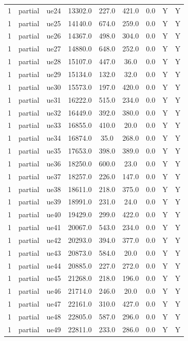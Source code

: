 \begin{table}[ht]
\begin{tabular}{|c|c|c|c|c|c|c|c|c|}
1 & partial & ue24 & 13302.0 & 227.0 & 421.0 & 0.0 & Y & Y \\
1 & partial & ue25 & 14140.0 & 674.0 & 259.0 & 0.0 & Y & Y \\
1 & partial & ue26 & 14367.0 & 498.0 & 304.0 & 0.0 & Y & Y \\
1 & partial & ue27 & 14880.0 & 648.0 & 252.0 & 0.0 & Y & Y \\
1 & partial & ue28 & 15107.0 & 447.0 & 36.0 & 0.0 & Y & Y \\
1 & partial & ue29 & 15134.0 & 132.0 & 32.0 & 0.0 & Y & Y \\
1 & partial & ue30 & 15573.0 & 197.0 & 420.0 & 0.0 & Y & Y \\
1 & partial & ue31 & 16222.0 & 515.0 & 234.0 & 0.0 & Y & Y \\
1 & partial & ue32 & 16449.0 & 392.0 & 380.0 & 0.0 & Y & Y \\
1 & partial & ue33 & 16855.0 & 410.0 & 20.0 & 0.0 & Y & Y \\
1 & partial & ue34 & 16874.0 & 35.0 & 268.0 & 0.0 & Y & Y \\
1 & partial & ue35 & 17653.0 & 398.0 & 389.0 & 0.0 & Y & Y \\
1 & partial & ue36 & 18250.0 & 600.0 & 23.0 & 0.0 & Y & Y \\
1 & partial & ue37 & 18257.0 & 226.0 & 147.0 & 0.0 & Y & Y \\
1 & partial & ue38 & 18611.0 & 218.0 & 375.0 & 0.0 & Y & Y \\
1 & partial & ue39 & 18991.0 & 231.0 & 24.0 & 0.0 & Y & Y \\
1 & partial & ue40 & 19429.0 & 299.0 & 422.0 & 0.0 & Y & Y \\
1 & partial & ue41 & 20067.0 & 543.0 & 234.0 & 0.0 & Y & Y \\
1 & partial & ue42 & 20293.0 & 394.0 & 377.0 & 0.0 & Y & Y \\
1 & partial & ue43 & 20873.0 & 584.0 & 20.0 & 0.0 & Y & Y \\
1 & partial & ue44 & 20885.0 & 227.0 & 272.0 & 0.0 & Y & Y \\
1 & partial & ue45 & 21268.0 & 218.0 & 196.0 & 0.0 & Y & Y \\
1 & partial & ue46 & 21714.0 & 246.0 & 20.0 & 0.0 & Y & Y \\
1 & partial & ue47 & 22161.0 & 310.0 & 427.0 & 0.0 & Y & Y \\
1 & partial & ue48 & 22805.0 & 587.0 & 296.0 & 0.0 & Y & Y \\
1 & partial & ue49 & 22811.0 & 233.0 & 286.0 & 0.0 & Y & Y \\

\end{tabular}
\end{table}
